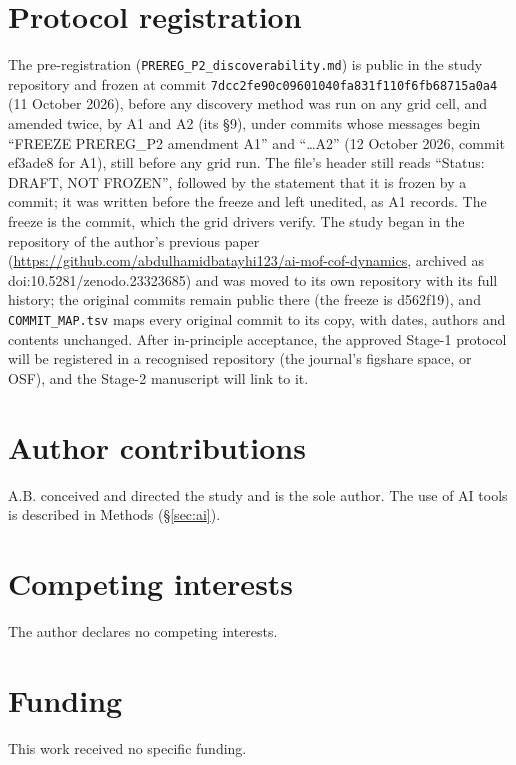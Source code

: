 \documentclass[11pt]{article}
\begin{document}
\section*{Protocol registration}
The pre-registration (\texttt{PREREG\_P2\_discoverability.md}) is public in the study
repository and frozen at commit \texttt{7dcc2fe90c09601040fa831f110f6fb68715a0a4}
(11 October 2026), before any discovery method was run on any grid cell, and amended twice,
by A1 and A2 (its \S9), under commits whose messages begin ``FREEZE PREREG\_P2 amendment
A1'' and ``\ldots A2'' (12 October 2026, commit ef3ade8 for A1), still before any grid run. The file's header still reads
``Status: DRAFT, NOT FROZEN'', followed by the statement that it is frozen by a commit; it
was written before the freeze and left unedited, as A1 records. The freeze is the commit,
which the grid drivers verify. The study began in the repository of the author's
previous paper (\url{https://github.com/abdulhamidbatayhi123/ai-mof-cof-dynamics}, archived as
doi:10.5281/zenodo.23323685) and was moved to its own repository with its full
history; the original commits remain public there (the freeze is d562f19), and
\texttt{COMMIT\_MAP.tsv} maps every original commit to its copy, with
dates, authors and contents unchanged. After in-principle
acceptance, the approved Stage-1 protocol will be registered in a recognised repository
(the journal's figshare space, or OSF), and the Stage-2 manuscript will link to it.

\section*{Author contributions}
A.B. conceived and directed the study and is the sole author. The use of AI tools is
described in Methods (\S\ref{sec:ai}).

\section*{Competing interests}
The author declares no competing interests.

\section*{Funding}
This work received no specific funding.
\end{document}

